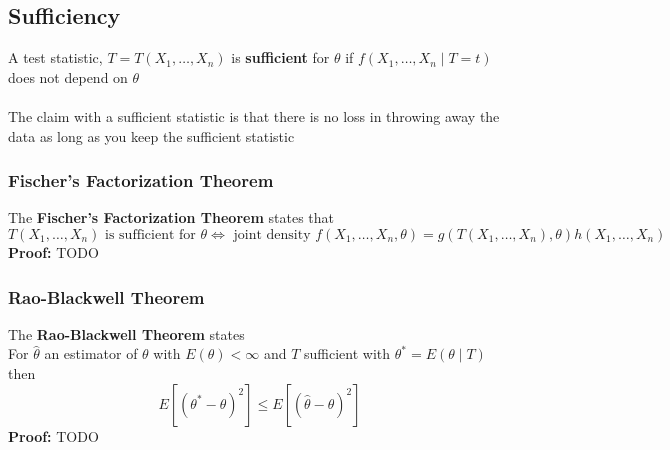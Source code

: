 \documentclass{article}
\begin{document}
\subsection{Sufficiency}
A test statistic, $T = T(X_1, \dots, X_n)$ is \textbf{sufficient} for $\theta$ if $f(X_1, \dots, X_n \mid T = t)$ does not depend on $\theta$\\\\
The claim with a sufficient statistic is that there is no loss in throwing away the data as long as you keep the sufficient statistic
\subsubsection{Fischer's Factorization Theorem}
The \textbf{Fischer's Factorization Theorem} states that 
\begin{equation*}
    T(X_1, \dots, X_n) \textrm{ is sufficient for } \theta \Longleftrightarrow \textrm{ joint density } f(X_1, \dots, X_n, \theta) = g(T(X_1, \dots, X_n), \theta)h(X_1, \dots, X_n)
\end{equation*}
\textbf{Proof:}
TODO
\subsubsection{Rao-Blackwell Theorem}
The \textbf{Rao-Blackwell Theorem} states\\
For $\hat{\theta}$ an estimator of $\theta$ with $E(\theta) < \infty$ and $T$ sufficient with $\theta^* = E(\theta \mid T)$ then
\begin{equation*}
    E[(\theta^* - \theta)^2] \leq E[(\hat{\theta} - \theta)^2]
\end{equation*}
\textbf{Proof:}
TODO
\end{document}
